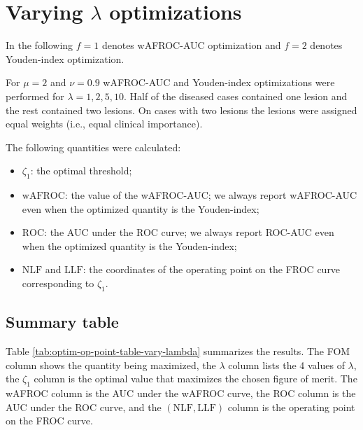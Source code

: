 \documentclass[
]{book}
\begin{document}
\hypertarget{optim-op-point-vary-lambda}{%
\section{\texorpdfstring{Varying \(\lambda\) optimizations}{Varying \textbackslash lambda optimizations}}\label{optim-op-point-vary-lambda}}

In the following \(f = 1\) denotes wAFROC-AUC optimization and \(f = 2\) denotes Youden-index optimization.

For \(\mu = 2\) and \(\nu = 0.9\) wAFROC-AUC and Youden-index optimizations were performed for \(\lambda = 1, 2, 5, 10\). Half of the diseased cases contained one lesion and the rest contained two lesions. On cases with two lesions the lesions were assigned equal weights (i.e., equal clinical importance).

The following quantities were calculated:

\begin{itemize}
\item
  \(\zeta_{1}\): the optimal threshold;
\item
  \(\text{wAFROC}\): the value of the wAFROC-AUC; we always report wAFROC-AUC even when the optimized quantity is the Youden-index;
\item
  \(\text{ROC}\): the AUC under the ROC curve; we always report ROC-AUC even when the optimized quantity is the Youden-index;
\item
  \(\text{NLF}\) and \(\text{LLF}\): the coordinates of the operating point on the FROC curve corresponding to \(\zeta_{1}\).
\end{itemize}

\hypertarget{summary-table}{%
\subsection{Summary table}\label{summary-table}}

Table \ref{tab:optim-op-point-table-vary-lambda} summarizes the results. The FOM column shows the quantity being maximized, the \(\lambda\) column lists the 4 values of \(\lambda\), the \(\zeta_1\) column is the optimal value that maximizes the chosen figure of merit. The wAFROC column is the AUC under the wAFROC curve, the ROC column is the AUC under the ROC curve, and the \(\left( \text{NLF}, \text{LLF}\right)\) column is the operating point on the FROC curve.
\end{document}
